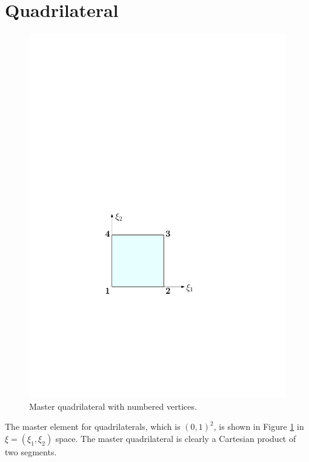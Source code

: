 \section{Quadrilateral}
\label{sec:Quad}

\begin{figure}[!ht]
\begin{center}
\includegraphics[scale=0.5]{./figures/MasterQuad.pdf}
\caption{Master quadrilateral with numbered vertices.}
\label{fig:MasterQuad}
\end{center}
\end{figure}

The master element for quadrilaterals, which is $(0,1)^2$, is shown in Figure \ref{fig:MasterQuad} in $\xi=(\xi_1,\xi_2)$ space.
The master quadrilateral is clearly a Cartesian product of two segments.


